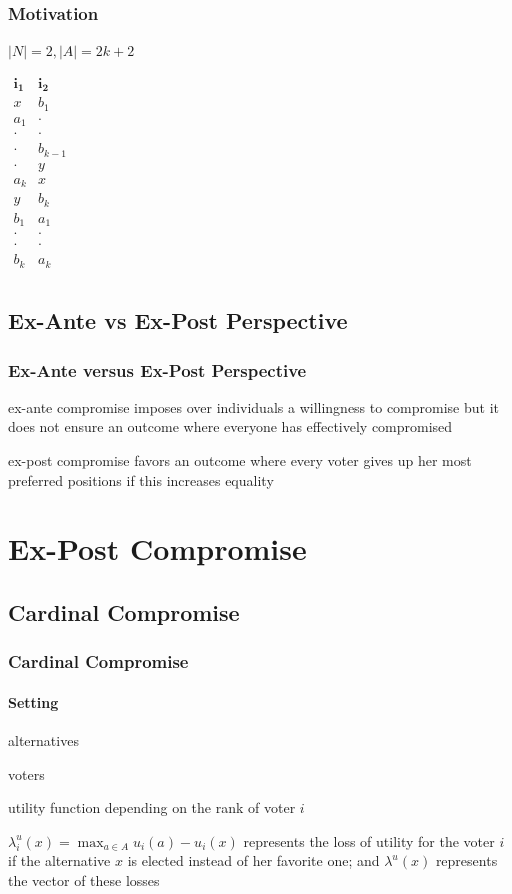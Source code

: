 \documentclass{beamer}
\newcommand{\R}{\mathbb{R}}
\begin{document}
\begin{frame}
 \frametitle{Motivation}
 $|N|=2, |A|=2k+2$
 \begin{center}
 	$
 	\begin{array}{cc}
 	\mathbf{i_1}& \mathbf{i_2} \\
 	x &b_1\\
 	a_1 &\cdot\\
 	\cdot &\cdot\\
 	\cdot &b_{k-1}\\
 	\cdot &y\\
 	a_k &x\\
 	y &b_k\\
 	b_1 &a_1\\
 	\cdot &\cdot\\
 	\cdot &\cdot\\
 	b_k &a_k\\
 	\end{array}
 	$
 	\end{center}
\end{frame}

\subsection{Ex-Ante vs Ex-Post Perspective}
\begin{frame}
	\frametitle{Ex-Ante versus Ex-Post Perspective}
	\begin{block}{ex-ante compromise}
		imposes over individuals a willingness to compromise but it does not ensure an outcome where everyone has effectively compromised 
	\end{block}
	\begin{block}{ex-post compromise}
		favors an outcome where every voter gives up her most preferred positions if this	increases equality 
	\end{block}
\end{frame}

\section{Ex-Post Compromise}
\subsection{Cardinal Compromise}
\begin{frame}
	\frametitle{Cardinal Compromise}
	\framesubtitle{Setting}
	\begin{description}[$u_i \in U(A) \subseteq \R^A$]
		\item[$A$] alternatives
		\item[$N$] voters
		\item[$u_i \in \R^A$] utility function depending on the rank of voter $i$ 
	\end{description}
	 \begin{block}{}
		{\color{blue}$\lambda_{i}^u(x) = \max_{a \in A} u_i(a) - u_{i}(x)$} represents the loss of utility for the voter $i$ if the alternative $x$ is elected instead of her favorite one; and {\color{blue}$\lambda ^{u}(x)$} represents the vector of these losses
	\end{block}
\end{frame}
\end{document}
